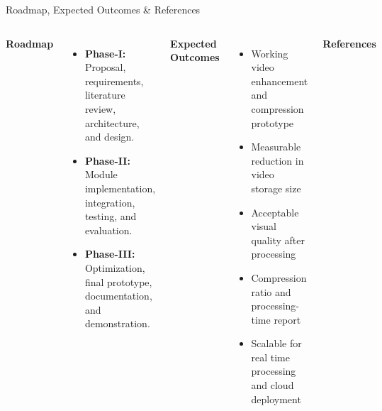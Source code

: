 \documentclass[aspectratio=169,11pt]{beamer}
\begin{document}
\begin{frame}{Roadmap, Expected Outcomes \& References}

\begin{columns}[T,totalwidth=\textwidth]


{\small
\textbf{\color{GEUBlue}Roadmap}
}

\begin{itemize}

\setlength{\itemsep}{0.8pt}

\scriptsize

\item
\textbf{Phase-I:}
Proposal, requirements, literature review,
architecture, and design.

\item
\textbf{Phase-II:}
Module implementation, integration,
testing, and evaluation.

\item
\textbf{Phase-III:}
Optimization, final prototype,
documentation, and demonstration.

\end{itemize}

\vspace{0.4mm}

{\small
\textbf{\color{GEUBlue}Expected Outcomes}
}

\begin{itemize}

\setlength{\itemsep}{0.5pt}

\tiny

\item
Working video enhancement and compression prototype

\item
Measurable reduction in video storage size

\item
Acceptable visual quality after processing

\item
Compression ratio and processing-time report

\item
Scalable for real time processing and cloud deployment

\end{itemize}



{\small
\textbf{\color{GEUBlue}References}
}

\begin{itemize}


\end{itemize}
\end{columns}
\end{frame}
\end{document}
